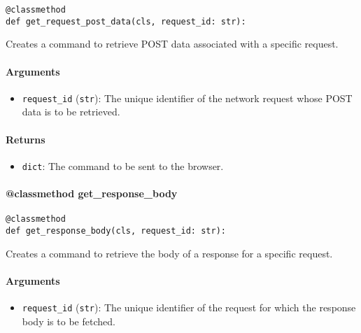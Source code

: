 \documentclass{article}
\begin{document}
\begin{lstlisting}[style=pythonstyle]
@classmethod
def get_request_post_data(cls, request_id: str):
\end{lstlisting}

\noindent Creates a command to retrieve POST data associated with a specific request.

\paragraph{Arguments}

\begin{itemize}
    \item \lstinline[style=pythonstyle]|request_id| (\lstinline[style=pythonstyle]|str|): The unique identifier of the network request whose POST data is to be retrieved.
\end{itemize}

\paragraph{Returns}

\begin{itemize}
    \item \lstinline[style=pythonstyle]|dict|: The command to be sent to the browser.
\end{itemize}

\paragraph{@classmethod get\_response\_body}

\begin{lstlisting}[style=pythonstyle]
@classmethod
def get_response_body(cls, request_id: str):
\end{lstlisting}

\noindent Creates a command to retrieve the body of a response for a specific request.

\paragraph{Arguments}

\begin{itemize}
    \item \lstinline[style=pythonstyle]|request_id| (\lstinline[style=pythonstyle]|str|): The unique identifier of the request for which the response body is to be fetched.
\end{itemize}
\end{document}

